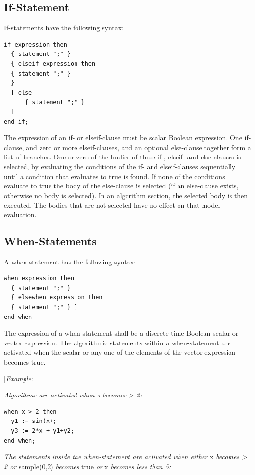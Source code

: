 \documentclass[10pt,a4paper]{report}
\def\doublelabel#1{\label{#1}\hypertarget{#1}{}}
\begin{document}
\subsection{If-Statement}\doublelabel{if-statement}

If-statements have the following syntax:

\begin{lstlisting}[language=grammar]
if expression then
  { statement ";" }
  { elseif expression then
  { statement ";" }
  }
  [ else 
      { statement ";" }
  ]
end if;
\end{lstlisting}

The expression of an if- or elseif-clause must be scalar Boolean
expression. One if-clause, and zero or more elseif-clauses, and an
optional else-clause together form a list of branches. One or zero of
the bodies of these if-, elseif- and else-clauses is selected, by
evaluating the conditions of the if- and elseif-clauses sequentially
until a condition that evaluates to true is found. If none of the
conditions evaluate to true the body of the else-clause is selected (if
an else-clause exists, otherwise no body is selected). In an algorithm
section, the selected body is then executed. The bodies that are not
selected have no effect on that model evaluation.

\subsection{When-Statements}\doublelabel{when-statements}

A when-statement has the following syntax:

\begin{lstlisting}[language=grammar]
when expression then
  { statement ";" }
  { elsewhen expression then
  { statement ";" } }
end when
\end{lstlisting}
The expression of a when-statement shall be a discrete-time Boolean
scalar or vector expression. The algorithmic statements within a
when-statement are activated when the scalar or any one of the elements
of the vector-expression becomes true.

{[}\emph{Example}:

\emph{Algorithms are activated when} x \emph{becomes \textgreater{} 2:}

\begin{lstlisting}[language=modelica]
when x > 2 then
  y1 := sin(x);
  y3 := 2*x + y1+y2;
end when;
\end{lstlisting}
\emph{The statements inside the when-statement are activated when
either} x \emph{becomes \textgreater{} 2 or} sample(0,2) \emph{becomes}
true \emph{or} x \emph{becomes less than 5:}
\end{document}
